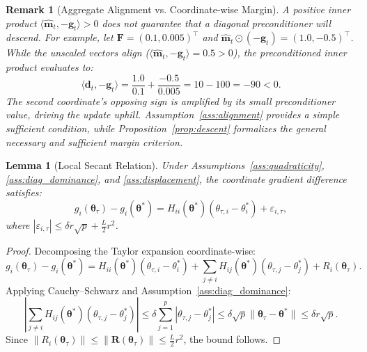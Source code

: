 \documentclass[11pt,a4paper]{article}
\newtheorem{lemma}{Lemma}
\newtheorem{remark}{Remark}
\begin{document}
\begin{remark}[Aggregate Alignment vs. Coordinate-wise Margin]
A positive inner product $\langle \hat{\mathbf{m}}_t, -\mathbf{g}_t \rangle > 0$ does not guarantee that a diagonal preconditioner will descend. For example, let $\mathbf{F} = (0.1, 0.005)^\top$ and $\hat{\mathbf{m}}_t \odot (-\mathbf{g}_t) = (1.0, -0.5)^\top$. While the unscaled vectors align ($\langle \hat{\mathbf{m}}_t, -\mathbf{g}_t \rangle = 0.5 > 0$), the preconditioned inner product evaluates to:
\[
\langle \mathbf{d}_t, -\mathbf{g}_t \rangle = \frac{1.0}{0.1} + \frac{-0.5}{0.005} = 10 - 100 = -90 < 0.
\]
The second coordinate's opposing sign is amplified by its small preconditioner value, driving the update uphill. Assumption~\ref{ass:alignment} provides a simple sufficient condition, while Proposition~\ref{prop:descent} formalizes the general necessary and sufficient margin criterion.
\end{remark}

\begin{lemma}[Local Secant Relation]
\label{lem:secant}
Under Assumptions~\ref{ass:quadraticity}, \ref{ass:diag_dominance}, and \ref{ass:displacement}, the coordinate gradient difference satisfies:
\begin{equation}
g_i(\boldsymbol{\theta}_\tau) - g_i(\boldsymbol{\theta}^*) = H_{ii}(\boldsymbol{\theta}^*)(\theta_{\tau,i} - \theta_i^*) + \varepsilon_{i,\tau},
\end{equation}
where $|\varepsilon_{i,\tau}| \le \delta r \sqrt{p} + \frac{L}{2} r^2$.
\end{lemma}

\begin{proof}
Decomposing the Taylor expansion coordinate-wise:
\begin{equation}
g_i(\boldsymbol{\theta}_\tau) - g_i(\boldsymbol{\theta}^*) = H_{ii}(\boldsymbol{\theta}^*)(\theta_{\tau,i} - \theta_i^*) + \sum_{j \ne i} H_{ij}(\boldsymbol{\theta}^*)(\theta_{\tau,j} - \theta_j^*) + R_i(\boldsymbol{\theta}_\tau).
\end{equation}
Applying Cauchy--Schwarz and Assumption~\ref{ass:diag_dominance}:
\begin{equation}
\left| \sum_{j \ne i} H_{ij}(\boldsymbol{\theta}^*)(\theta_{\tau,j} - \theta_j^*) \right| \le \delta \sum_{j=1}^p |\theta_{\tau,j} - \theta_j^*| \le \delta \sqrt{p} \|\boldsymbol{\theta}_\tau - \boldsymbol{\theta}^*\| \le \delta r \sqrt{p}.
\end{equation}
Since $\|R_i(\boldsymbol{\theta}_\tau)\| \le \|\mathbf{R}(\boldsymbol{\theta}_\tau)\| \le \frac{L}{2} r^2$, the bound follows.
\end{proof}
\end{document}
